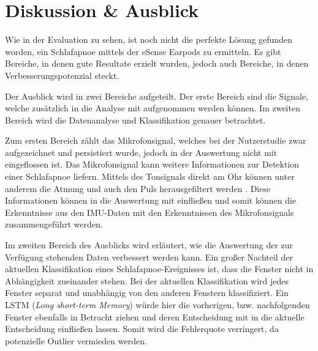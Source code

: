 
\chapter{Diskussion \& Ausblick}
\label{ch:FutureWork}
%


Wie in der Evaluation zu sehen, ist noch nicht die perfekte Lösung gefunden worden, ein Schlafapnoe mittels der eSense Earpods zu ermitteln.
Es gibt Bereiche, in denen gute Resultate erzielt wurden, jedoch auch Bereiche, in denen Verbesserungspotenzial steckt. 

Der Ausblick wird in zwei Bereiche aufgeteilt.
Der erste Bereich sind die Signale, welche zusätzlich in die Analyse mit aufgenommen werden können.
Im zweiten Bereich wird die Datenanalyse und Klassifikation genauer betrachtet.

Zum ersten Bereich zählt das Mikrofonsignal, welches bei der Nutzerstudie zwar aufgezeichnet und persistiert wurde, jedoch in der Auswertung nicht mit eingeflossen ist. 
Das Mikrofonsignal kann weitere Informationen zur Detektion einer Schlafapnoe liefern. 
Mittels des Tonsignals direkt am Ohr können unter anderem die Atmung und auch den Puls herausgefiltert werden \cite{nomaWearableDataAcquisition2005}.
Diese Informationen können in die Auswertung mit einfließen und somit können die Erkenntnisse aus den IMU-Daten mit den Erkenntnissen des Mikrofonsignals zusammengeführt werden.

Im zweiten Bereich des Ausblicks wird erläutert, wie die Auswertung der zur Verfügung stehenden Daten verbessert werden kann.
Ein großer Nachteil der aktuellen Klassifikation eines Schlafapnoe-Ereignisses ist, dass die Fenster nicht in Abhängigkeit zueinander stehen. 
Bei der aktuellen Klassifikation wird jedes Fenster separat und unabhängig von den anderen Fenstern klassifiziert.
Ein LSTM (\textit{Long short-term Memory}) würde hier die vorherigen, bzw. nachfolgenden Fenster ebenfalls in Betracht ziehen und deren Entscheidung mit in die aktuelle Entscheidung einfließen lassen. 
Somit wird die Fehlerquote verringert, da potenzielle Outlier vermieden werden.

